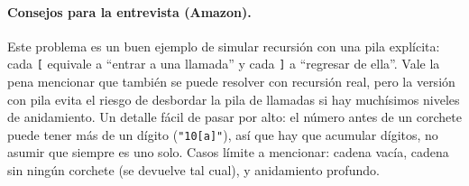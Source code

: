 \paragraph{Consejos para la entrevista (Amazon).} Este problema es un buen
ejemplo de simular recursión con una pila explícita: cada \texttt{[}
equivale a ``entrar a una llamada'' y cada \texttt{]} a ``regresar de
ella''. Vale la pena mencionar que también se puede resolver con
recursión real, pero la versión con pila evita el riesgo de desbordar la
pila de llamadas si hay muchísimos niveles de anidamiento. Un detalle
fácil de pasar por alto: el número antes de un corchete puede tener más de
un dígito (\texttt{"10[a]"}), así que hay que acumular dígitos, no
asumir que siempre es uno solo. Casos límite a mencionar: cadena vacía,
cadena sin ningún corchete (se devuelve tal cual), y anidamiento profundo.
